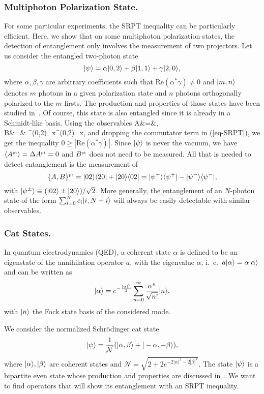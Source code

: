 \subsubsection{Multiphoton Polarization State.}

For some particular experiments, the SRPT inequality can be particularly efficient. Here, we show that on some multiphoton polarization states, the detection of entanglement only involves the measurement of two projectors. Let us consider the entangled two-photon state
\[ | \psi \rangle = \alpha | 0,2 \rangle + \beta | 1,1 \rangle + \gamma | 2,0 \rangle, \label{eq-multi} \]
where $\alpha, \beta, \gamma$ are arbitrary coefficients such that $ \mbox{Re}(\alpha^* \gamma)\neq 0$ and $| m,n \rangle$ denotes $m$ photons in a given polarization state and $n$ photons orthogonally polarized to the $m$ firsts. The production and properties of those states have been studied in~\cite{Tse00}.  Of course, this state is also entangled since it is already in a Schmidt-like basis. Using the observables
\bea  A&=&, \\  B&=& \sigma^{(0,2)}_x\otimes\sigma^{(0,2)}_x, \eea
and dropping the commutator term in (\ref{eq-SRPT}), we get the inequality $0 \ge | \mbox{Re}(\alpha^* \gamma)|$. Since $| \psi \rangle$ is never the vacuum, we have $\langle A^{\mbox{\tiny \textup{pt}}} \rangle = \Delta A^{\mbox{\tiny \textup{pt}}} = 0$ and $B^{\mbox{\tiny \textup{pt}}}$ does not need to be measured. All that is needed to detect entanglement is the measurement of
\[ \{A,B\}^{\mbox{\tiny \textup{pt}}}= | 02 \rangle \langle 20 |+| 20 \rangle \langle 02 | = | \psi^+ \rangle \langle \psi^+ |-| \psi^- \rangle \langle \psi^- |, \]
with $| \psi^\pm \rangle\equiv (| 02 \rangle \pm | 20 \rangle)/\sqrt 2$. More generally, the entanglement of an $N$-photon state of the form $\sum_{i=0}^N c_i | i,N-i  \rangle$  will always be easily detectable with similar observables.

\subsubsection{Cat States.}

In quantum electrodynamics (QED), a coherent state $\alpha$ is defined to be an eigenstate of the annihilation operator $a$, with the eigenvalue $\alpha$, i.~e.~$a | \alpha \rangle=\alpha| \alpha \rangle$ and can be written as
\[ | \alpha \rangle =e^{-\frac{|\alpha|^2}{2}}\sum_{n=0}^{\infty} \frac{\alpha^n}{\sqrt{n!}} | n \rangle, \]
with $| n \rangle$ the Fock state basis of the considered mode.

We consider the normalized Schr\"odinger cat state
\[ | \psi \rangle= \frac{1}{\mathcal{N}} (| \alpha, \beta \rangle + | -\alpha,-\beta \rangle), \label{eq-cat}\]
where $| \alpha \rangle, | \beta \rangle$ are coherent states and $\mathcal{N}=\sqrt{2+2 e^{-2|\alpha|^2-2|\beta|^2}}$.
The state $| \psi \rangle$ is a bipartite even state whose production and properties are discussed in~\cite{Ger07}. We want to find operators that will show its entanglement with an SRPT inequality.

